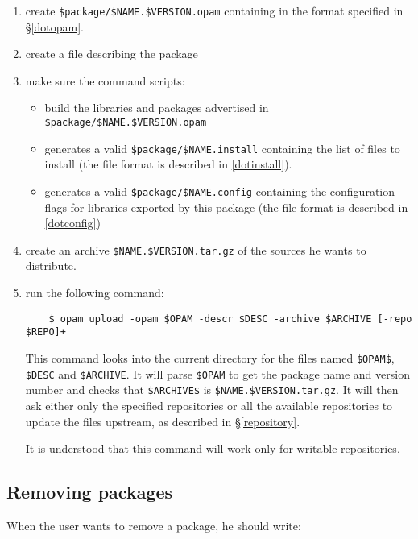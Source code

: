 \documentclass[a4paper,11pt]{article}
\begin{document}
\begin{enumerate}

\item create \verb+$package/$NAME.$VERSION.opam+ containing in the format
  specified in \S\ref{dotopam}.

\item create a file describing the package

\item make sure the command scripts:
\begin{itemize}
\item build the libraries and packages advertised in
  \verb+$package/$NAME.$VERSION.opam+
\item generates a valid \verb+$package/$NAME.install+ containing the
  list of files to install (the file format is described in
  \ref{dotinstall}).
\item generates a valid \verb+$package/$NAME.config+ containing the
  configuration flags for libraries exported by this package (the file
  format is described in \ref{dotconfig})
\end{itemize}

\item create an archive \verb+$NAME.$VERSION.tar.gz+ of the sources he
  wants to distribute.

\item run the following command:

\begin{verbatim}
    $ opam upload -opam $OPAM -descr $DESC -archive $ARCHIVE [-repo $REPO]+
\end{verbatim}

This command looks into the current directory for the files named 
\verb+$OPAM$+, \verb+$DESC+ and \verb+$ARCHIVE+.
It will parse \verb+$OPAM+ to get the package name and version
number and checks that \verb+$ARCHIVE$+ is
\verb+$NAME.$VERSION.tar.gz+. It will then ask either only the
specified repositories or all the available repositories to update the
files upstream, as described in \S\ref{repository}.

It is understood that this command will work only for writable
repositories.

\end{enumerate}

\subsection{Removing packages}

When the user wants to remove a package, he should write:
\end{document}

